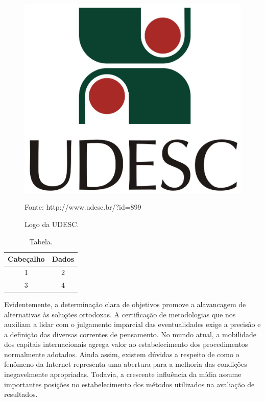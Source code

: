 \documentclass[a5paper,10pt]{udesc}
\begin{document}
\begin{figure}
\centering
\caption{Logo da UDESC.}

\includegraphics[scale=0.4]{fig/Marca_UDESC_vertical}


Fonte: http://www.udesc.br/?id=899


\end{figure}





\begin{table}
\caption{Tabela.}
\centering
\vspace{0.2cm}
\begin{tabular}{cc}
\hline
Cabeçalho & Dados \\
\hline

1 & 2\\
3 & 4\\
\hline


\end{tabular}

\end{table}


          Evidentemente, a determinação clara de objetivos promove a alavancagem de alternativas às soluções ortodoxas. A certificação de metodologias que nos auxiliam a lidar com o julgamento imparcial das eventualidades exige a precisão e a definição das diversas correntes de pensamento. No mundo atual, a mobilidade dos capitais internacionais agrega valor ao estabelecimento dos procedimentos normalmente adotados. Ainda assim, existem dúvidas a respeito de como o fenômeno da Internet representa uma abertura para a melhoria das condições inegavelmente apropriadas. Todavia, a crescente influência da mídia assume importantes posições no estabelecimento dos métodos utilizados na avaliação de resultados. 
\end{document}
